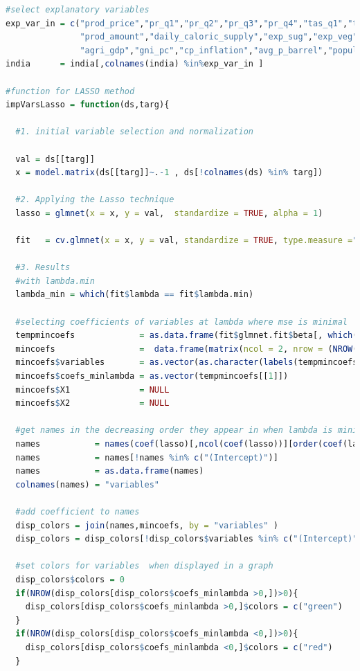 \documentclass[11pt]{article}
\begin{document}
\begin{lstlisting}[language= R]
#select explanatory variables
exp_var_in = c("prod_price","pr_q1","pr_q2","pr_q3","pr_q4","tas_q1","tas_q2","tas_q3","tas_q4",
               "prod_amount","daily_caloric_supply","exp_sug","exp_veg","exp_cer","imp_sug","imp_veg","imp_cer", 
               "agri_gdp","gni_pc","cp_inflation","avg_p_barrel","population") 
india      = india[,colnames(india) %in%exp_var_in ]

#function for LASSO method  
impVarsLasso = function(ds,targ){
  
  #1. initial variable selection and normalization
  
  val = ds[[targ]]
  x = model.matrix(ds[[targ]]~.-1 , ds[!colnames(ds) %in% targ])
  
  #2. Applying the Lasso technique
  lasso = glmnet(x = x, y = val,  standardize = TRUE, alpha = 1)
  
  fit   = cv.glmnet(x = x, y = val, standardize = TRUE, type.measure ="mse", alpha=1, nfolds=3)
  
  #3. Results
  #with lambda.min
  lambda_min = which(fit$lambda == fit$lambda.min)
  
  #selecting coefficients of variables at lambda where mse is minimal
  tempmincoefs             = as.data.frame(fit$glmnet.fit$beta[, which(fit$lambda == fit$lambda.min)])
  mincoefs                 =  data.frame(matrix(ncol = 2, nrow = (NROW(tempmincoefs))))
  mincoefs$variables       = as.vector(as.character(labels(tempmincoefs)[[1]]))
  mincoefs$coefs_minlambda = as.vector(tempmincoefs[[1]])
  mincoefs$X1              = NULL
  mincoefs$X2              = NULL
  
  #get names in the decreasing order they appear in when lambda is minimal
  names           = names(coef(lasso)[,ncol(coef(lasso))][order(coef(lasso)[,ncol(coef(lasso))],decreasing=TRUE)])
  names           = names[!names %in% c("(Intercept)")]
  names           = as.data.frame(names)
  colnames(names) = "variables"
  
  #add coefficient to names
  disp_colors = join(names,mincoefs, by = "variables" )
  disp_colors = disp_colors[!disp_colors$variables %in% c("(Intercept)"),]
  
  #set colors for variables  when displayed in a graph
  disp_colors$colors = 0
  if(NROW(disp_colors[disp_colors$coefs_minlambda >0,])>0){
    disp_colors[disp_colors$coefs_minlambda >0,]$colors = c("green")
  }
  if(NROW(disp_colors[disp_colors$coefs_minlambda <0,])>0){
    disp_colors[disp_colors$coefs_minlambda <0,]$colors = c("red")
  }
  

\end{lstlisting}
\end{document}
